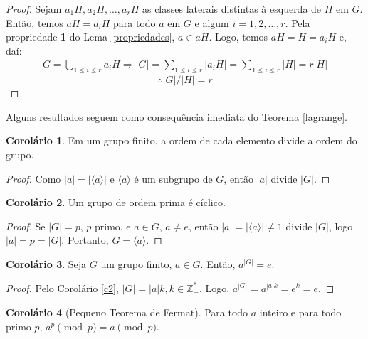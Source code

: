 \documentclass[a4paper,portuguese,11pt,twoside, leqno]{book}
\theoremstyle{definition}
\newtheorem{corollary}{Corolário}[theorem]
\begin{document}
	\begin{proof}
		Sejam $a_1H, a_2H, \dots , a_rH$ as classes laterais distintas à esquerda de $H$ em $G$. Então, temos $aH = a_iH$ para todo $a$ em $G$ e algum $i = 1,2,\dots,r$. Pela propriedade \textbf{1} do Lema \eqref{propriedades}, $a\in aH$. Logo, temos $aH = H = a_iH$ e, daí:
		\begin{align*}
		G = \bigcup_{1\leq i\leq r}^{}a_iH \Rightarrow |G| = \sum_{1\leq i\leq r}^{}|a_iH| = \sum_{1\leq i\leq r}^{}|H| = r|H|
		\end{align*} 
		\begin{equation*}
		\therefore |G|/|H| = r
		\end{equation*}
		
	\end{proof}
	\par\vspace{0.3cm} Alguns resultados seguem como consequência imediata do Teorema \eqref{lagrange}.
	
	\begin{corollary}
		\label{c2}
		Em um grupo finito, a ordem de cada elemento divide a ordem do grupo.
	\end{corollary}
	
	\begin{proof}
		Como $|a| = |\langle a\rangle|$ e $\langle a \rangle$ é um subgrupo de $G$, então $|a|$ divide $|G|$. 
	\end{proof}
	
	\begin{corollary}
		\label{c3}
		Um grupo de ordem prima é cíclico.
	\end{corollary}
	
	\begin{proof}
		Se $|G| = p$, $p$ primo, e $a\in G$, $a\neq e$, então $|a| = |\langle a\rangle | \neq 1$ divide $|G|$, logo $|a| = p = |G|$. Portanto, $G = \langle a\rangle$. 
	\end{proof}
	
	\begin{corollary}
		\label{c4}
		Seja $G$ um grupo finito, $a\in G$. Então, $a^{|G|} = e.$
	\end{corollary}
	
	\begin{proof}
		Pelo Corolário \eqref{c2}, $|G| = |a| k, k\in\mathbb{Z}_{+}^{*}$. Logo, $a^{|G|} = a^{|a|k} = e^k = e$. 
	\end{proof}
	
	\begin{corollary}[Pequeno Teorema de Fermat]
		\label{c5}
		Para todo $a$ inteiro e para todo primo $p$, $a^p \pmod p = a\pmod p$.
	\end{corollary}
	
\end{document}
